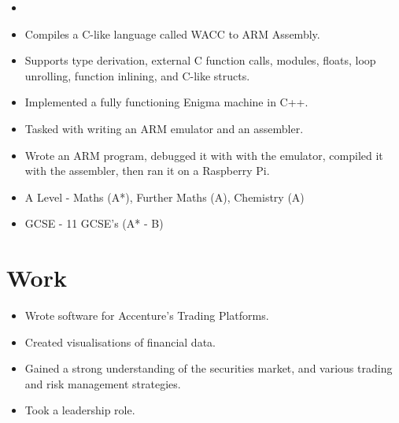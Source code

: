 \documentclass{jcgcv}
\begin{document}
\begin{column}
\begin{adjustwidth}{0.3cm}{}
\begin{itemize}
  \item {}
  \item Compiles a C-like language called WACC to ARM Assembly.
  \item Supports type derivation, external C function calls, modules, floats, loop unrolling, function inlining, and C-like structs.
\end{itemize}

\begin{itemize}
  \item Implemented a fully functioning Enigma machine in C++.
\end{itemize}

\begin{itemize}
  \item Tasked with writing an ARM emulator and an assembler.
  \item Wrote an ARM program, debugged it with with the emulator, compiled it with the assembler, then ran it on a Raspberry Pi.
\end{itemize}

\end{adjustwidth}
\vspace{10pt}

\begin{itemize}
  \item A Level - Maths (A*), Further Maths (A), Chemistry (A)
  \item GCSE - 11 GCSE’s (A* - B)
\end{itemize}



\section{Work}

\begin{itemize}
  \item Wrote software for Accenture’s Trading Platforms.
  \item Created visualisations of financial data.
  \item Gained a strong understanding of the securities market, and various trading and risk management strategies.
  \item Took a leadership role.
\end{itemize}


\end{column}
\end{document}
